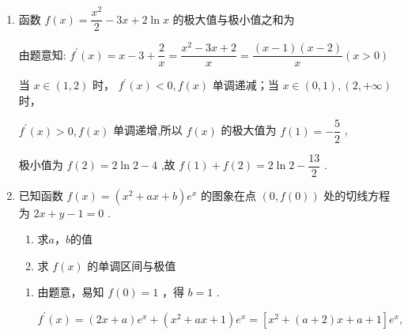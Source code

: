 \begin{enumerate}
\begin{enumerate}
\begin{jieda}
            由 ${f}^{\prime }\left( x\right)  < 0$ ,可得: $x \in  \left( {0,1}\right)  \cup  \left( {1,\dfrac{3}{2}}\right)$ ,所以 $f\left( x\right)$ 在 $\left( {0,1}\right) ,\left( {1,\dfrac{3}{2}}\right)$ 单调递减.
            
            所以 $f\left( x\right)$ 有极大值 $f\left( 0\right)$ ,有极小值 $f\left( \dfrac{3}{2}\right)$ .
        \end{jieda}
        
        \item 函数 $f\left( x\right)  = \dfrac{{x}^{2}}{2} - {3x} + 2\ln x$ 的极大值与极小值之和为

        \begin{jieda}
            由题意知: ${f}^{\prime }\left( x\right)  = x - 3 + \dfrac{2}{x} = \dfrac{{x}^{2} - {3x} + 2}{x} = \dfrac{\left( {x - 1}\right) \left( {x - 2}\right) }{x}\left( {x > 0}\right)$
            
            当 $x \in  \left( {1,2}\right)$ 时， ${f}^{\prime }\left( x\right)  < 0,f\left( x\right)$ 单调递减；当 $x \in  \left( {0,1}\right) ,\left( {2, + \infty }\right)$ 时，
            
            ${f}^{\prime }\left( x\right)  > 0,f\left( x\right)$ 单调递增,所以 $f\left( x\right)$ 的极大值为 $f\left( 1\right)  =  - \dfrac{5}{2}$ ,
            
            极小值为 $f\left( 2\right)  = 2\ln 2 - 4$ ,故 $f\left( 1\right)  + f\left( 2\right)  = 2\ln 2 - \dfrac{13}{2}$ .
        \end{jieda}
        
        \item 已知函数 $f\left( x\right)  = \left( {{x}^{2} + {ax} + b}\right) {{e}}^{x}$ 的图象在点 $\left( {0,f\left( 0\right) }\right)$ 处的切线方程为 ${2x} + y - 1 = 0$ .
        \begin{enumerate}
            \item 求$a$，$b$的值
            \item 求 $f\left( x\right)$ 的单调区间与极值
        \end{enumerate}
        \begin{jieda}
            \begin{enumerate}
                \item 由题意，易知 $f\left( 0\right)  = 1$ ，得 $b = 1$ .
                
                ${f}^{\prime }\left( x\right)  = \left( {{2x} + a}\right) {{e}}^{x} + \left( {{x}^{2} + {ax} + 1}\right) {{e}}^{x} = \left\lbrack  {{x}^{2} + \left( {a + 2}\right) x + a + 1}\right\rbrack  {{e}}^{x},$
                

\end{enumerate}
\end{jieda}
\end{enumerate}
\end{enumerate}
